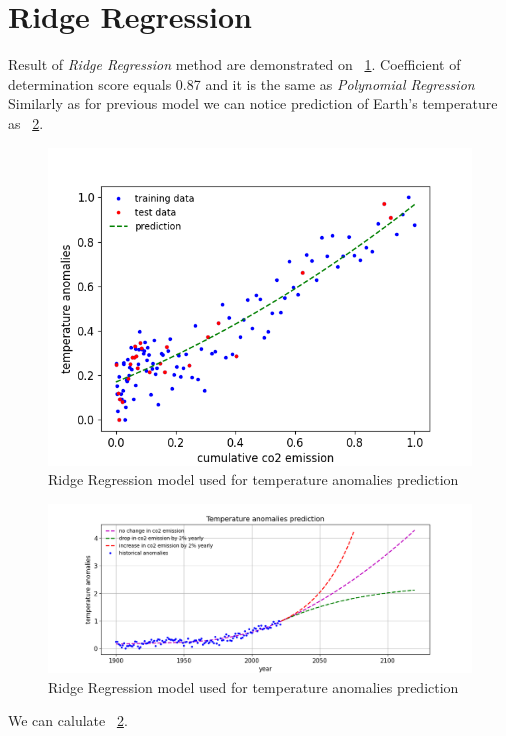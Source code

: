 \section{Ridge Regression}
Result of \textit{Ridge Regression} method are demonstrated on ~\ref{fig:ridge-regression}. Coefficient of determination score equals 0.87 and it is the same as \textit{Polynomial Regression}
Similarly as for previous model we can notice prediction of Earth's temperature as ~\ref{fig:ridge-regression-result}. 
\begin{figure}[h]
  \includegraphics[width=\linewidth]{img/ridge-regression.png}
  \caption{Ridge Regression model used for temperature anomalies prediction}
  \label{fig:ridge-regression}
\end{figure}
\begin{figure}[h]
  \includegraphics[width=\linewidth]{img/ridge-regression-result.png}
  \caption{Ridge Regression model used for temperature anomalies prediction}
  \label{fig:ridge-regression-result}
\end{figure}
We can calulate ~\ref{fig:ridge-regression-result}. 
